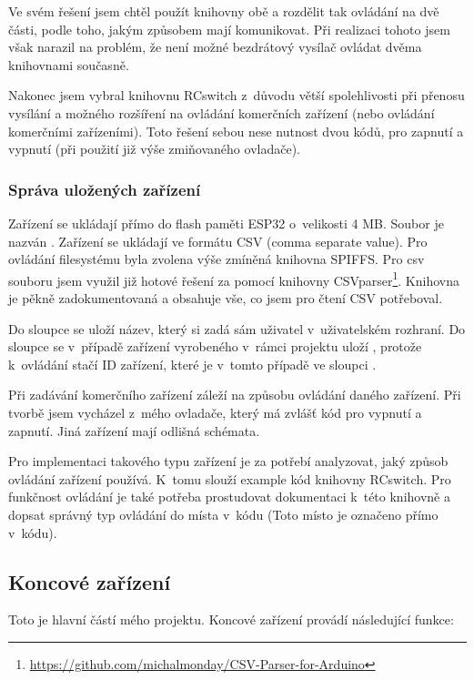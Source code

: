 \documentclass[11pt,a4paper,twoside,openright]{report}
\begin{document}
	
	Ve svém řešení jsem chtěl použít knihovny obě a rozdělit tak ovládání na dvě části, podle toho, jakým způsobem mají komunikovat. Při realizaci tohoto jsem však narazil na problém, že není možné bezdrátový vysílač ovládat dvěma knihovnami současně.
	
	
	Nakonec jsem vybral knihovnu RCswitch z~důvodu větší spolehlivosti při přenosu vysílání a možného rozšíření na ovládání komerčních zařízení (nebo ovládání komerčními zařízeními). Toto řešení sebou nese nutnost dvou kódů, pro zapnutí a vypnutí (při použití již výše zmiňovaného ovladače). 
	
	
	\subsubsection{Správa uložených zařízení}
	
	Zařízení se ukládají přímo do flash paměti ESP32 o~velikosti 4 MB. Soubor je nazván . Zařízení se ukládají ve formátu CSV (comma separate value). Pro ovládání filesystému byla zvolena výše zmíněná knihovna SPIFFS. Pro  csv souboru jsem využil již hotové řešení za pomocí knihovny CSVparser\footnote{\url{https://github.com/michalmonday/CSV-Parser-for-Arduino}}. Knihovna je pěkně zadokumentovaná a obsahuje vše, co jsem pro čtení CSV potřeboval. 
	
	
	Do sloupce  se uloží název, který si zadá sám uživatel v~uživatelském rozhraní. Do sloupce  se v~případě zařízení vyrobeného v~rámci projektu uloží , protože k~ovládání stačí ID zařízení, které je v~tomto případě ve sloupci .
	
	
	Při zadávání komerčního zařízení záleží na způsobu ovládání daného zařízení. Při tvorbě jsem vycházel z~mého ovladače, který má zvlášť kód pro vypnutí a zapnutí. Jiná zařízení mají odlišná schémata. 
	
	
	Pro implementaci takového typu zařízení je za potřebí analyzovat, jaký způsob ovládání zařízení používá. K~tomu slouží example kód knihovny RCswitch. Pro funkčnost ovládání je také potřeba prostudovat dokumentaci k~této knihovně a dopsat správný typ ovládání do místa v~kódu (Toto místo je označeno přímo v~kódu).
	
	\subsection{Koncové zařízení}
	
	Toto je hlavní částí mého projektu. Koncové zařízení provádí následující funkce:
	
\end{document}
